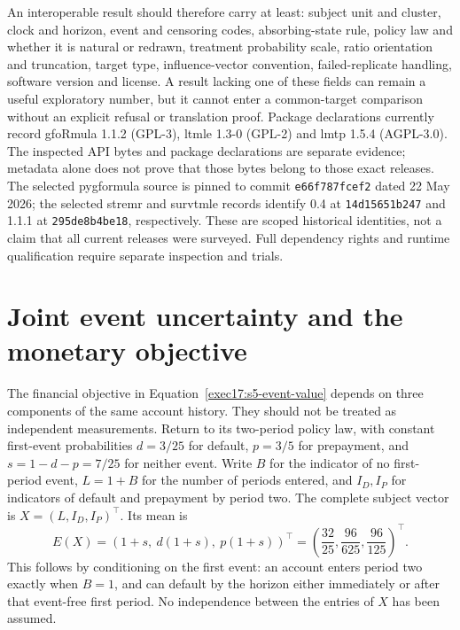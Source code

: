 An interoperable result should therefore carry at least: subject unit and
cluster, clock and horizon, event and censoring codes, absorbing-state rule,
policy law and whether it is natural or redrawn, treatment probability scale,
ratio orientation and truncation, target type, influence-vector convention,
failed-replicate handling, software version and license. A result lacking one
of these fields can remain a useful exploratory number, but it cannot enter a
common-target comparison without an explicit refusal or translation proof.
Package declarations currently record gfoRmula 1.1.2 (GPL-3), ltmle 1.3-0
(GPL-2) and lmtp 1.5.4 (AGPL-3.0). The inspected API bytes and package
declarations are separate evidence; metadata alone does not prove that those
bytes belong to those exact releases. The selected pygformula source is
pinned to commit \texttt{e66f787fcef2} dated 22 May 2026; the selected
stremr and survtmle records identify 0.4 at \texttt{14d15651b247} and 1.1.1
at \texttt{295de8b4be18}, respectively. These are scoped historical identities,
not a claim that all current releases were surveyed. Full dependency rights
and runtime qualification require separate inspection and trials.
\citep{exec17_s5_paths}

\section{Joint event uncertainty and the monetary objective}
\label{exec17:s5-joint}

The financial objective in Equation~\eqref{exec17:s5-event-value} depends on
three components of the same account history. They should not be treated as
independent measurements. Return to its two-period policy law, with constant
first-event probabilities $d=3/25$ for default, $p=3/5$ for prepayment, and
$s=1-d-p=7/25$ for neither event. Write $B$ for the indicator of no first-period
event, $L=1+B$ for the number of periods entered, and $I_D,I_P$ for indicators
of default and prepayment by period two. The complete subject vector is
$X=(L,I_D,I_P)^\top$. Its mean is
\begin{equation}
 E(X)=\left(1+s,\ d(1+s),\ p(1+s)\right)^\top
      =\left(\frac{32}{25},\frac{96}{625},\frac{96}{125}\right)^\top.
 \label{exec17:s5-joint-mean}
\end{equation}
This follows by conditioning on the first event: an account enters period two
exactly when $B=1$, and can default by the horizon either immediately or after
that event-free first period. No independence between the entries of $X$ has
been assumed.

